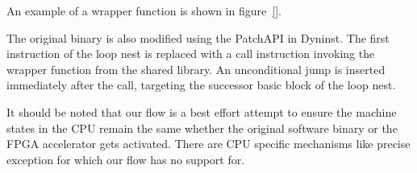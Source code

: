 An example of a wrapper function is shown in figure~\ref{}.

The original binary is also modified using the PatchAPI in Dyninst. The first instruction of the loop nest is replaced with a call instruction invoking the wrapper function from the
 shared library. An unconditional jump is inserted immediately after the call, targeting the successor basic block of the loop nest. 
 
 It should be noted that our flow is a best effort attempt to ensure the machine states in the CPU remain the same whether the original software binary or the FPGA accelerator gets activated. There are CPU specific mechanisms like precise exception for which our flow has no support for. 











